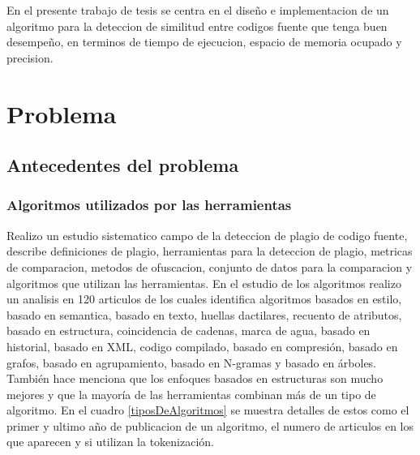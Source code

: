En el presente trabajo de tesis se centra en el diseño e implementacion de un algoritmo para la deteccion de similitud entre codigos fuente que tenga buen desempeño, en terminos de tiempo de ejecucion, espacio de memoria ocupado y precision.

\section{Problema}
\subsection{Antecedentes del problema}
\subsubsection{Algoritmos utilizados por las herramientas}
\cite{Novak2019} Realizo un estudio sistematico campo de la deteccion de plagio de codigo fuente, describe definiciones de plagio, herramientas para la deteccion de plagio, metricas de comparacion, metodos de ofuscacion, conjunto de datos para la comparacion y algoritmos que utilizan las herramientas. En el estudio de los algoritmos realizo un analisis en 120 articulos de los cuales identifica algoritmos basados en estilo, basado en semantica, basado en texto, huellas dactilares, recuento de atributos, basado en estructura, coincidencia de cadenas, marca de agua, basado en historial, basado en XML, codigo compilado, basado en compresión, basado en grafos, basado en agrupamiento, basado en N-gramas y basado en árboles.  También hace menciona que los enfoques basados en estructuras son mucho mejores y que la mayoría de las herramientas combinan más de un tipo de algoritmo. En el cuadro \ref{tiposDeAlgoritmos} se muestra detalles de estos como el primer y ultimo año de publicacion de un algoritmo, el numero de articulos en los que aparecen y si utilizan la tokenización.

